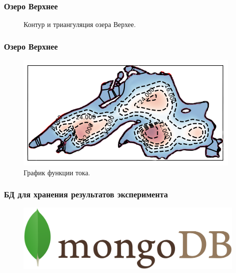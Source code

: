 \documentclass[10pt,utf8,presentation,compress]{beamer}
\begin{document}
\begin{frame}
\frametitle{Озеро Верхнее}
	\begin{figure}[H]
		\centering
		\hfill
		\caption{Контур и триангуляция озера Верхее.}
	\end{figure}
\end{frame}

\begin{frame}
\frametitle{Озеро Верхнее}
	\begin{figure}[H]
		\centering
		\includegraphics[width=0.9\linewidth]{images/ex4/psi/1}
		\caption{График функции тока.}
	\end{figure}
\end{frame}

\begin{frame}
\frametitle{БД для хранения результатов эксперимента}
	\begin{figure}[H]
		\centering
		\includegraphics[width=0.8\linewidth]{images/slides/logo/mongo}
	\end{figure}
\end{frame}
\end{document}
